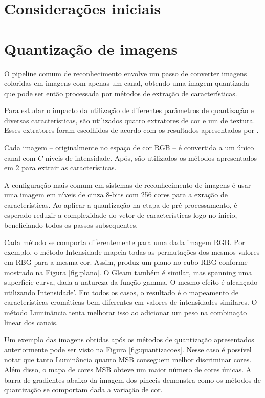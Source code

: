 \section{Considerações iniciais}


\section{Quantização de imagens}

O pipeline comum de reconhecimento envolve um passo de converter imagens coloridas em imagens com apenas um canal, obtendo uma imagem quantizada que pode ser então processada por métodos de extração de características.

Para estudar o impacto da utilização de diferentes parâmetros de quantização e diversas características, são utilizados quatro extratores de cor e um de textura. Esses extratores foram escolhidos de acordo com os resultados apresentados por .

Cada imagem -- originalmente no espaço de cor RGB -- é convertida a um único canal com $C$ níveis de intensidade. Após, são utilizados os métodos apresentados em \ref{} para extrair as características.

A configuração mais comum em sistemas de reconhecimento de imagens é usar uma imagem em níveis de cinza 8-bits com 256 cores para a exração de características. Ao aplicar a quantização na etapa de pré-processamento, é esperado reduzir a complexidade do vetor de características logo no ínicio, beneficiando todos os passos subsequentes.

Cada método se comporta diferentemente para uma dada imagem RGB. Por exemplo, o método Intensidade mapeia todas as permutações dos mesmos valores em RBG para a mesma cor. Assim, produz um plano no cubo RBG conforme mostrado na Figura \ref{fig:plano}. O Gleam também é similar, mas spanning uma superfície curva, dada a natureza da função gamma. O mesmo efeito é alcançado utilizando Intensidade'. Em todos os casos, o resultado é o mapeamento de características cromáticas bem diferentes em valores de intensidades similares. O método Luminância tenta melhorar isso ao adicionar um peso na combinação linear dos canais.

Um exemplo das imagens obtidas após os métodos de quantização apresentados anteriormente pode ser visto na Figura \ref{fig:quantizacoes}. Nesse caso é possível notar que tanto Luminância quanto MSB conseguem melhor discriminar cores. Além disso, o mapa de cores MSB obteve um maior número de cores únicas. A barra de gradientes abaixo da imagem dos pinceis demonstra como os métodos de quantização se comportam dada a variação de cor.

